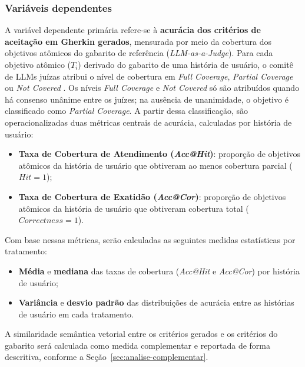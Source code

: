 \subsubsection*{Variáveis dependentes}

A variável dependente primária refere-se à \textbf{acurácia dos critérios de aceitação em Gherkin gerados}, mensurada por meio da cobertura dos objetivos atômicos do gabarito de referência (\textit{LLM-as-a-Judge}). Para cada objetivo atômico ($T_i$) derivado do gabarito de uma história de usuário, o comitê de LLMs juízas atribui o nível de cobertura em \textit{Full Coverage}, \textit{Partial Coverage} ou \textit{Not Covered} \cite{wang2025}. Os níveis \textit{Full Coverage} e \textit{Not Covered} só são atribuídos quando há consenso unânime entre os juízes; na ausência de unanimidade, o objetivo é classificado como \textit{Partial Coverage}. A partir dessa classificação, são operacionalizadas duas métricas centrais de acurácia, calculadas por história de usuário:
\begin{itemize} 
    \item \textbf{Taxa de Cobertura de Atendimento (\textit{Acc@Hit})}: proporção de objetivos atômicos da história de usuário que obtiveram ao menos cobertura parcial ($Hit = 1$); 
    \item \textbf{Taxa de Cobertura de Exatidão (\textit{Acc@Cor})}: proporção de objetivos atômicos da história de usuário que obtiveram cobertura total ($Correctness = 1$). 
\end{itemize} 
Com base nessas métricas, serão calculadas as seguintes medidas estatísticas por tratamento: 
\begin{itemize} 
    \item \textbf{Média} e \textbf{mediana} das taxas de cobertura (\textit{Acc@Hit} e \textit{Acc@Cor}) por história de usuário; 
    \item \textbf{Variância} e \textbf{desvio padrão} das distribuições de acurácia entre as histórias de usuário em cada tratamento. 
\end{itemize}

A similaridade semântica vetorial entre os critérios gerados e os critérios do gabarito será calculada como medida complementar e reportada de forma descritiva, conforme a Seção~\ref{sec:analise-complementar}.

